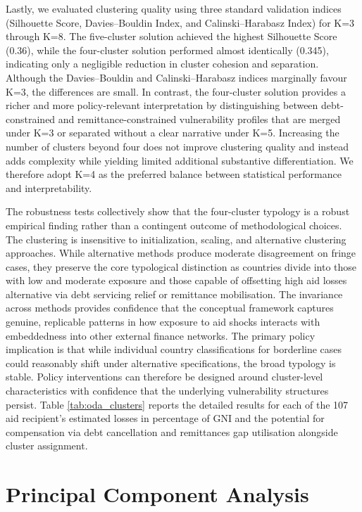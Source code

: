 \documentclass[fleqn,10pt,twocolumn]{wlscirep}
\begin{document}
{	%
	Lastly, we evaluated clustering quality using three standard validation indices (Silhouette Score, Davies–Bouldin Index, and Calinski–Harabasz Index) for K=3 through K=8. The five-cluster solution achieved the highest Silhouette Score (0.36), while the four-cluster solution performed almost identically (0.345), indicating only a negligible reduction in cluster cohesion and separation. Although the Davies–Bouldin and Calinski–Harabasz indices marginally favour K=3, the differences are small. In contrast, the four-cluster solution provides a richer and more policy-relevant interpretation by distinguishing between debt-constrained and remittance-constrained vulnerability profiles that are merged under K=3 or separated without a clear narrative under K=5. Increasing the number of clusters beyond four does not improve clustering quality and instead adds complexity while yielding limited additional substantive differentiation. We therefore adopt K=4 as the preferred balance between statistical performance and interpretability.
	
	The robustness tests collectively show that the four-cluster typology is a robust empirical finding rather than a contingent outcome of methodological choices. The clustering is insensitive to initialization, scaling, and alternative clustering approaches. While alternative methods produce moderate disagreement on fringe cases, they preserve the core typological distinction as countries divide into those with low and moderate exposure and those capable of offsetting high aid losses alternative via debt servicing relief or remittance mobilisation. The invariance across methods provides confidence that the conceptual framework captures genuine, replicable patterns in how exposure to aid shocks interacts with embeddedness into other external finance networks. The primary policy implication is that while individual country classifications for borderline cases could reasonably shift under alternative specifications, the broad typology is stable. Policy interventions can therefore be designed around cluster-level characteristics with confidence that the underlying vulnerability structures persist. Table \ref{tab:oda_clusters} reports the detailed results for each of the 107 aid recipient's estimated losses in percentage of GNI and the potential for compensation via debt cancellation and remittances gap utilisation alongside cluster assignment. 
}

\section{Principal Component Analysis}
\end{document}
